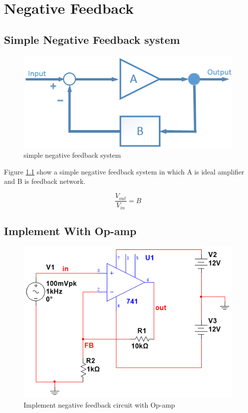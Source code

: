 \chapter{Negative Feedback}
\section{Simple Negative Feedback system}

\begin{figure}[htbp]
	\centering
	\includegraphics[scale=0.6]{"../Photo/Chap1/Feedback system"}
	\caption{simple negative feedback system}
	\label{fig:Feedback system}
\end{figure}

Figure \ref{fig:Feedback system} show a simple negative feedback system in which A is ideal amplifier and B is feedback network. 

\[  \frac{V_{out}}{V_{in}} = B  \] 

\section{Implement With Op-amp}


\begin{figure}[htbp]
	\centering
	\includegraphics[scale=0.7]{"../Photo/Chap1/Op-amp feedback"}
	\caption{Implement negative feedback circuit with Op-amp}
	\label{fig:Op-amp feedback}
\end{figure}


